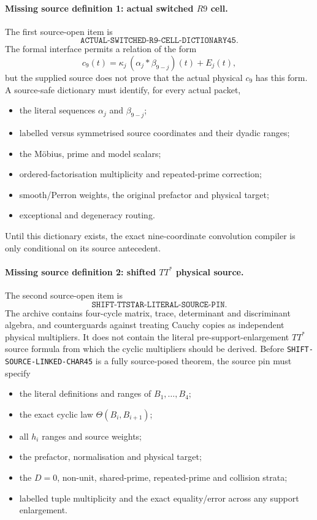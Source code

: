 \documentclass[11pt]{article}
\theoremstyle{definition}
\newcommand{\1}{\mathbf 1}
\begin{document}
\paragraph{Missing source definition 1: actual switched $R9$ cell.}
The first source-open item is
\[
  \boxed{\texttt{ACTUAL-SWITCHED-R9-CELL-DICTIONARY45}}.
\]
The formal interface permits a relation of the form
\[
  c_9(t)=\kappa_j\,(\alpha_j*\beta_{9-j})(t)+E_j(t),
\]
but the supplied source does not prove that the actual physical $c_9$ has
this form.  A source-safe dictionary must identify, for every actual packet,
\begin{itemize}
  \item the literal sequences $\alpha_j$ and $\beta_{9-j}$;
  \item labelled versus symmetrised source coordinates and their dyadic
        ranges;
  \item the M\"obius, prime and model scalars;
  \item ordered-factorisation multiplicity and repeated-prime correction;
  \item smooth/Perron weights, the original prefactor and physical target;
  \item exceptional and degeneracy routing.
\end{itemize}
Until this dictionary exists, the exact nine-coordinate convolution compiler
is only conditional on its source antecedent.

\paragraph{Missing source definition 2: shifted $TT^*$ physical source.}
The second source-open item is
\[
  \boxed{\texttt{SHIFT-TTSTAR-LITERAL-SOURCE-PIN}}.
\]
The archive contains four-cycle matrix, trace, determinant and discriminant
algebra, and counterguards against treating Cauchy copies as independent
physical multipliers.  It does not contain the literal pre-support-enlargement
$TT^*$ source formula from which the cyclic multipliers should be derived.
Before \texttt{SHIFT-SOURCE-LINKED-CHAR45} is a fully source-posed theorem,
the source pin must specify
\begin{itemize}
  \item the literal definitions and ranges of $B_1,\ldots,B_4$;
  \item the exact cyclic law $\Theta(B_i,B_{i+1})$;
  \item all $h_i$ ranges and source weights;
  \item the prefactor, normalisation and physical target;
  \item the $D=0$, non-unit, shared-prime, repeated-prime and collision strata;
  \item labelled tuple multiplicity and the exact equality/error across any
        support enlargement.
\end{itemize}
\end{document}
